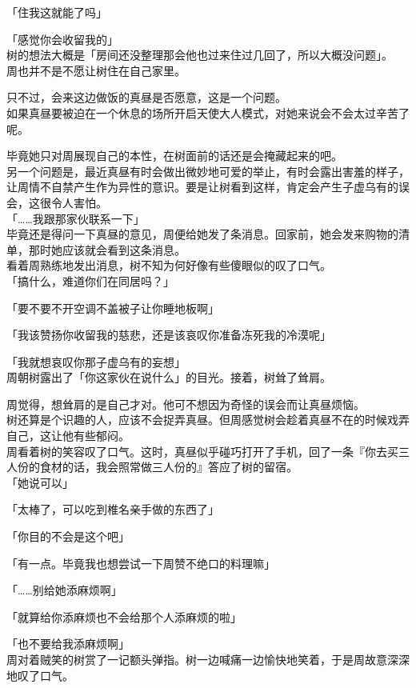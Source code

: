 「住我这就能了吗」

「感觉你会收留我的」\\

树的想法大概是「房间还没整理那会他也过来住过几回了，所以大概没问题」。\\

周也并不是不愿让树住在自己家里。

只不过，会来这边做饭的真昼是否愿意，这是一个问题。\\

如果真昼要被迫在一个休息的场所开启天使大人模式，对她来说会不会太过辛苦了呢。

毕竟她只对周展现自己的本性，在树面前的话还是会掩藏起来的吧。\\

另一个问题是，最近真昼有时会做出微妙地可爱的举止，有时会露出害羞的样子，让周情不自禁产生作为异性的意识。要是让树看到这样，肯定会产生子虚乌有的误会，这很令人害怕。\\

「……我跟那家伙联系一下」\\

毕竟还是得问一下真昼的意见，周便给她发了条消息。回家前，她会发来购物的清单，那时她应该就会看到这条消息。\\

看着周熟练地发出消息，树不知为何好像有些傻眼似的叹了口气。\\

「搞什么，难道你们在同居吗？」

「要不要不开空调不盖被子让你睡地板啊」

「我该赞扬你收留我的慈悲，还是该哀叹你准备冻死我的冷漠呢」

「我就想哀叹你那子虚乌有的妄想」\\

周朝树露出了「你这家伙在说什么」的目光。接着，树耸了耸肩。

周觉得，想耸肩的是自己才对。他可不想因为奇怪的误会而让真昼烦恼。\\

树还算是个识趣的人，应该不会捉弄真昼。但周感觉树会趁着真昼不在的时候戏弄自己，这让他有些郁闷。\\

周看着树的笑容叹了口气。这时，真昼似乎碰巧打开了手机，回了一条『你去买三人份的食材的话，我会照常做三人份的』答应了树的留宿。\\

「她说可以」

「太棒了，可以吃到椎名亲手做的东西了」

「你目的不会是这个吧」

「有一点。毕竟我也想尝试一下周赞不绝口的料理嘛」

「……别给她添麻烦啊」

「就算给你添麻烦也不会给那个人添麻烦的啦」

「也不要给我添麻烦啊」\\

周对着贼笑的树赏了一记额头弹指。树一边喊痛一边愉快地笑着，于是周故意深深地叹了口气。
